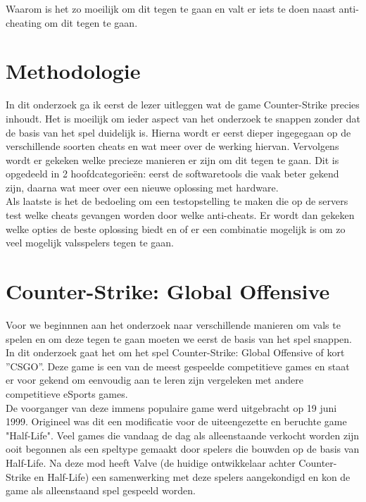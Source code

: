\documentclass[pdftex,a4paper,12pt,twoside]{report}
\begin{document}
Waarom is het zo moeilijk om dit tegen te gaan en valt er iets te doen naast anti-cheating om dit tegen te gaan.


\chapter{Methodologie}
\label{ch:methodologie}


In dit onderzoek ga ik eerst de lezer uitleggen wat de game Counter-Strike precies inhoudt. Het is moeilijk om ieder aspect van het onderzoek te snappen zonder dat de basis van het spel duidelijk is. Hierna wordt er eerst dieper ingegegaan op de verschillende soorten cheats en wat meer over de werking hiervan. Vervolgens wordt er gekeken welke precieze manieren er zijn om dit tegen te gaan. Dit is opgedeeld in 2 hoofdcategorieën: eerst de softwaretools die vaak beter gekend zijn, daarna wat meer over een nieuwe oplossing met hardware. 
\\

Als laatste is het de bedoeling om een testopstelling te maken die op de servers test welke cheats gevangen worden door welke anti-cheats. Er wordt dan gekeken welke opties de beste oplossing biedt en of er een combinatie mogelijk is om zo veel mogelijk valsspelers tegen te gaan. 


\chapter{Counter-Strike: Global Offensive}
\label{ch:csgo}
Voor we beginnnen aan het onderzoek naar verschillende manieren om vals te spelen en om deze tegen te gaan moeten we eerst de basis van het spel snappen. In dit onderzoek gaat het om het spel Counter-Strike: Global Offensive of kort ''CSGO''. Deze game is een van de meest gespeelde competitieve games en staat er voor gekend om eenvoudig aan te leren zijn vergeleken met andere competitieve eSports games. 
\\

De voorganger van deze immens populaire game werd uitgebracht op 19 juni 1999. Origineel was dit een modificatie voor de uiteengezette en beruchte game "Half-Life". Veel games die vandaag de dag als alleenstaande verkocht worden zijn ooit begonnen als een speltype gemaakt door spelers die bouwden op de basis van Half-Life. Na deze mod heeft Valve (de huidige ontwikkelaar achter Counter-Strike en Half-Life) een samenwerking met deze spelers aangekondigd en kon de game als alleenstaand spel gespeeld worden.
\\
\end{document}
